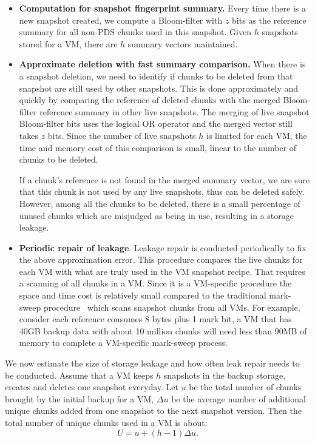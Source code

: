 \begin{itemize}
\item {\bf Computation for snapshot fingerprint summary.}
Every time there is a new snapshot created,
we compute a Bloom-filter with $z$ bits as the reference summary for all non-PDS chunks used 
in this snapshot. Given $h$ snapshots stored for a VM, there are $h$ summary vectors maintained.

\item {\bf Approximate deletion with fast summary comparison.}
When there is a snapshot deletion,  
we need to identify if  chunks to be deleted from that snapshot
are still used by other snapshots. 
This is done approximately and quickly by comparing the 
reference of deleted chunks  with
the merged Bloom-filter reference summary in other live snapshots.
The merging of live snapshot Bloom-filter bits uses the logical OR operator 
and the merged vector still takes $z$ bits.
Since the number of live snapshots $h$ is limited for
each VM, 
the time and memory cost of this comparison is small, linear to the number of chunks to be deleted.

If a chunk's reference is not found in the merged summary vector, we are sure that
this chunk is not used by any live snapshots, thus can be deleted safely.
However, among all the chunks to be deleted, 
there is a small percentage of unused chunks  which
are misjudged as  being in use, resulting in a storage leakage.

\item {\bf Periodic repair of leakage}.
Leakage repair is conducted periodically to fix the above approximation error.
This procedure compares the live chunks for each VM with what are truly used in the VM snapshot recipe.
That requires a scanning of all chunks in a VM. Since it is a VM-specific procedure 
the space and time cost is relatively small compared to the traditional mark-sweep procedure~\cite{Guo2011} which scans snapshot 
chunks from all VMs.
For example,
consider each reference consumes 8 bytes plus  1 mark bit, a VM that has 40GB backup data with about
10 million chunks will need less than 90MB of memory to complete a VM-specific mark-sweep process.
\end{itemize}

We now estimate the size of storage leakage and how often leak repair needs to be conducted.
Assume that  a VM keeps $h$ snapshots in the backup storage, creates and deletes one snapshot
everyday. Let $u$ be the total number of chunks brought by the initial backup for a VM, $\Delta u$ be the average
number of additional unique chunks added from one snapshot to the next snapshot version. Then the total number of unique
chunks used in a VM is about:
\[
U = u + (h-1)\Delta u.
\]

